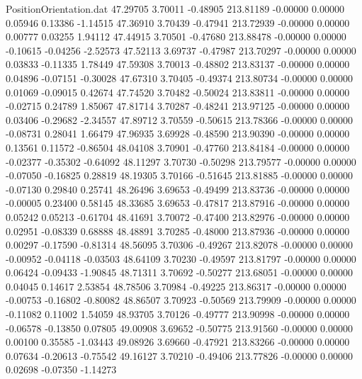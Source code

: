 \begin{filecontents}{PositionOrientation.dat}
  47.29705    3.70011   -0.48905   213.81189   -0.00000    0.00000    0.05946    0.13386   -1.14515
  47.36910    3.70439   -0.47941   213.72939   -0.00000    0.00000    0.00777    0.03255    1.94112
  47.44915    3.70501   -0.47680   213.88478   -0.00000    0.00000   -0.10615   -0.04256   -2.52573
  47.52113    3.69737   -0.47987   213.70297   -0.00000    0.00000    0.03833   -0.11335    1.78449
  47.59308    3.70013   -0.48802   213.83137   -0.00000    0.00000    0.04896   -0.07151   -0.30028
  47.67310    3.70405   -0.49374   213.80734   -0.00000    0.00000    0.01069   -0.09015    0.42674
  47.74520    3.70482   -0.50024   213.83811   -0.00000    0.00000   -0.02715    0.24789    1.85067
  47.81714    3.70287   -0.48241   213.97125   -0.00000    0.00000    0.03406   -0.29682   -2.34557
  47.89712    3.70559   -0.50615   213.78366   -0.00000    0.00000   -0.08731    0.28041    1.66479
  47.96935    3.69928   -0.48590   213.90390   -0.00000    0.00000    0.13561    0.11572   -0.86504
  48.04108    3.70901   -0.47760   213.84184   -0.00000    0.00000   -0.02377   -0.35302   -0.64092
  48.11297    3.70730   -0.50298   213.79577   -0.00000    0.00000   -0.07050   -0.16825    0.28819
  48.19305    3.70166   -0.51645   213.81885   -0.00000    0.00000   -0.07130    0.29840    0.25741
  48.26496    3.69653   -0.49499   213.83736   -0.00000    0.00000   -0.00005    0.23400    0.58145
  48.33685    3.69653   -0.47817   213.87916   -0.00000    0.00000    0.05242    0.05213   -0.61704
  48.41691    3.70072   -0.47400   213.82976   -0.00000    0.00000    0.02951   -0.08339    0.68888
  48.48891    3.70285   -0.48000   213.87936   -0.00000    0.00000    0.00297   -0.17590   -0.81314
  48.56095    3.70306   -0.49267   213.82078   -0.00000    0.00000   -0.00952   -0.04118   -0.03503
  48.64109    3.70230   -0.49597   213.81797   -0.00000    0.00000    0.06424   -0.09433   -1.90845
  48.71311    3.70692   -0.50277   213.68051   -0.00000    0.00000    0.04045    0.14617    2.53854
  48.78506    3.70984   -0.49225   213.86317   -0.00000    0.00000   -0.00753   -0.16802   -0.80082
  48.86507    3.70923   -0.50569   213.79909   -0.00000    0.00000   -0.11082    0.11002    1.54059
  48.93705    3.70126   -0.49777   213.90998   -0.00000    0.00000   -0.06578   -0.13850    0.07805
  49.00908    3.69652   -0.50775   213.91560   -0.00000    0.00000    0.00100    0.35585   -1.03443
  49.08926    3.69660   -0.47921   213.83266   -0.00000    0.00000    0.07634   -0.20613   -0.75542
  49.16127    3.70210   -0.49406   213.77826   -0.00000    0.00000    0.02698   -0.07350   -1.14273

\end{filecontents}

